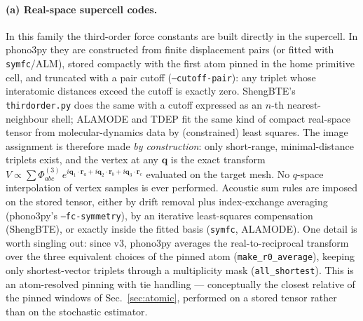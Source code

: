 \documentclass[11pt,a4paper]{article}
\newcommand{\qv}{\mathbf{q}}
\begin{document}
\paragraph{(a) Real-space supercell codes.}  In this family the
third-order force constants are built directly in the supercell.  In
phono3py \cite{phono3py,phono3py2015} they are constructed from finite
displacement pairs (or fitted with
\texttt{symfc}/ALM), stored compactly with the first atom pinned in the
home primitive cell, and truncated with a pair cutoff
(\texttt{--cutoff-pair}): any triplet whose interatomic distances exceed
the cutoff is exactly zero.  ShengBTE's \texttt{thirdorder.py}
\cite{shengbte} does the same with a cutoff expressed as an $n$-th
nearest-neighbour shell; ALAMODE \cite{alamode} and TDEP \cite{tdep} fit
the same kind of compact real-space tensor from molecular-dynamics data
by (constrained) least squares.  The image assignment is therefore made
\emph{by construction}: only short-range, minimal-distance triplets
exist, and the vertex at any $\qv$ is the exact transform
$V\propto\sum\Phi^{(3)}_{abc}\,e^{i\qv_1\cdot\mathbf r_a+
i\qv_2\cdot\mathbf r_b+i\qv_3\cdot\mathbf r_c}$ evaluated on the target
mesh.  No $q$-space interpolation of vertex samples is ever performed.
Acoustic sum rules are imposed on the stored tensor, either by drift
removal plus index-exchange averaging (phono3py's
\texttt{--fc-symmetry}), by an iterative least-squares compensation
(ShengBTE), or exactly inside the fitted basis (\texttt{symfc}, ALAMODE).
One detail is worth singling out: since v3, phono3py averages the
real-to-reciprocal transform over the three equivalent choices of the
pinned atom (\texttt{make\_r0\_average}), keeping only shortest-vector
triplets through a multiplicity mask (\texttt{all\_shortest}).  This is
an atom-resolved pinning with tie handling --- conceptually the closest
relative of the pinned windows of Sec.~\ref{sec:atomic}, performed on a
stored tensor rather than on the stochastic estimator.
\end{document}
